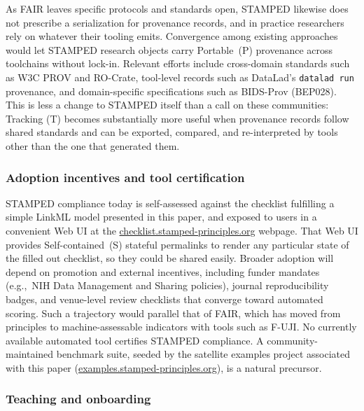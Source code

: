 \documentclass{article}
\makeatletter
\newcommand{\hyanchor}[1]{\texorpdfstring{\Hy@raisedlink{\hypertarget{#1}{}}}{}}
\newcommand{\httpsurl}[1]{\href{https://#1}{#1}}
\newcommand{\anchoredsubsubsection}[2]{\subsubsection[#2]{\hyanchor{#1}#2}}
\makeatother
\begin{document}
As FAIR leaves specific protocols and standards open, STAMPED likewise does not prescribe a serialization for provenance records, and in practice researchers rely on whatever their tooling emits.
Convergence among existing approaches would let STAMPED research objects carry Portable~(P) provenance across toolchains without lock-in.
Relevant efforts include cross-domain standards such as W3C PROV\cite{w3c_provenance_working_group_prov-overview_2013} and RO-Crate\cite{peroni_packaging_2022}, tool-level records such as DataLad's\cite{halchenko_datalad_2021} \texttt{datalad run} provenance, and domain-specific specifications such as BIDS-Prov (BEP028)\cite{bids_community_bep028_2025}.
This is less a change to STAMPED itself than a call on these communities: Tracking (T) becomes substantially more useful when provenance records follow shared standards and can be exported, compared, and re-interpreted by tools other than the one that generated them.


\anchoredsubsubsection{adoption-incentives}{Adoption incentives and tool certification}

STAMPED compliance today is self-assessed against the checklist fulfilling a simple LinkML model\cite{cody_baker_stamped-principlesstamped-checklist-schema_2026} presented in this paper, and exposed to users in a convenient Web UI at the \httpsurl{checklist.stamped-principles.org} webpage.
That Web UI provides Self-contained~(S) stateful permalinks to render any particular state of the filled out checklist, so they could be shared easily.
Broader adoption will depend on promotion and external incentives, including funder mandates (e.g.,\ NIH Data Management and Sharing policies), journal reproducibility badges\cite{center_for_open_science_open_2023}, and venue-level review checklists that converge toward automated scoring. 
Such a trajectory would parallel that of FAIR, which has moved from principles to machine-assessable indicators with tools such as F-UJI\cite{devaraju_automated_2021}.
No currently available automated tool certifies STAMPED compliance.
A community-maintained benchmark suite, seeded by the satellite examples project associated with this paper (\httpsurl{examples.stamped-principles.org}), is a natural precursor.


\anchoredsubsubsection{teaching}{Teaching and onboarding}
\end{document}
